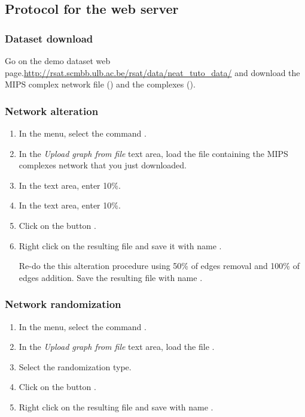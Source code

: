 \subsection{Protocol for the web server}

\subsubsection{Dataset download}
Go on the demo dataset web page.\url{http://rsat.scmbb.ulb.ac.be/rsat/data/neat\_tuto\_data/} and download the MIPS complex network file () and the complexes ().

\subsubsection{Network alteration}

\begin{enumerate}

\item In the \neat menu, select the command . 
\item In the \textit{Upload graph from file} text area, load the file  containing the MIPS complexes network that you just downloaded.
\item In the  text area, enter 10\%.
\item In the  text area, enter 10\%.
\item Click on the button . 
\item Right click on the resulting file and save it with name .

Re-do the this alteration procedure using 50\% of edges removal and 100\% of edges addition. Save the resulting file with name .

\end{enumerate}

\subsubsection{Network randomization}

\begin{enumerate}

\item In the \neat menu, select the command . 
\item In the \textit{Upload graph from file} text area, load the file .
\item Select the  randomization type.
\item Click on the button . 
\item Right click on the resulting file and save with name .

\end{enumerate}

